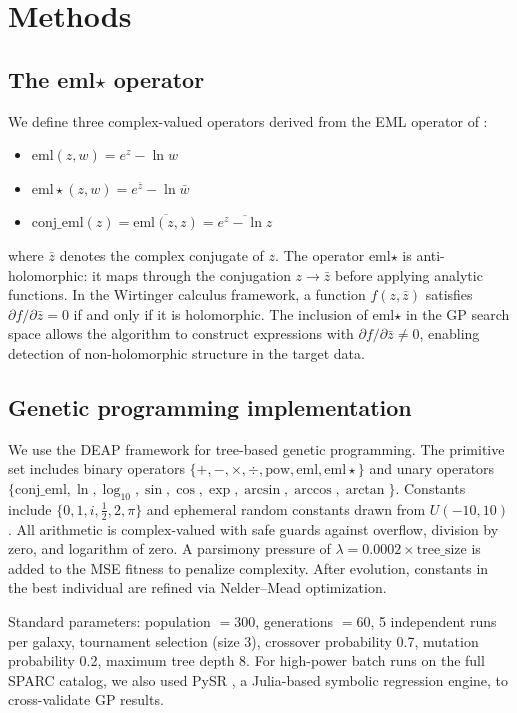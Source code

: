 \documentclass[12pt,a4paper]{article}
\begin{document}
\section{Methods}

\subsection{The eml$\star$ operator}

We define three complex-valued operators derived from the EML operator of \citet{Odrzywolek2026}:
\begin{itemize}
\item $\mathrm{eml}(z, w) = e^z - \ln w$
\item $\mathrm{eml\star}(z, w) = e^{\bar{z}} - \ln \bar{w}$
\item $\mathrm{conj\_eml}(z) = \overline{\mathrm{eml}(z, z)} = \overline{e^z - \ln z}$
\end{itemize}
where $\bar{z}$ denotes the complex conjugate of $z$. The operator eml$\star$ is anti-holomorphic: it maps through the conjugation $z \to \bar{z}$ before applying analytic functions. In the Wirtinger calculus framework, a function $f(z, \bar{z})$ satisfies $\partial f/\partial \bar{z} = 0$ if and only if it is holomorphic. The inclusion of eml$\star$ in the GP search space allows the algorithm to construct expressions with $\partial f/\partial \bar{z} \neq 0$, enabling detection of non-holomorphic structure in the target data.

\subsection{Genetic programming implementation}

We use the DEAP framework \citep{Fortin2012} for tree-based genetic programming. The primitive set includes binary operators $\{+, -, \times, \div, \mathrm{pow}, \mathrm{eml}, \mathrm{eml\star}\}$ and unary operators $\{\mathrm{conj\_eml}, \ln, \log_{10}, \sin, \cos, \exp, \arcsin, \arccos, \arctan\}$. Constants include $\{0, 1, i, \tfrac{1}{2}, 2, \pi\}$ and ephemeral random constants drawn from $U(-10, 10)$. All arithmetic is complex-valued with safe guards against overflow, division by zero, and logarithm of zero. A parsimony pressure of $\lambda = 0.0002 \times \mathrm{tree\_size}$ is added to the MSE fitness to penalize complexity. After evolution, constants in the best individual are refined via Nelder--Mead optimization.

Standard parameters: population $= 300$, generations $= 60$, 5 independent runs per galaxy, tournament selection (size 3), crossover probability 0.7, mutation probability 0.2, maximum tree depth 8. For high-power batch runs on the full SPARC catalog, we also used PySR \citep{Cranmer2023}, a Julia-based symbolic regression engine, to cross-validate GP results.
\end{document}
